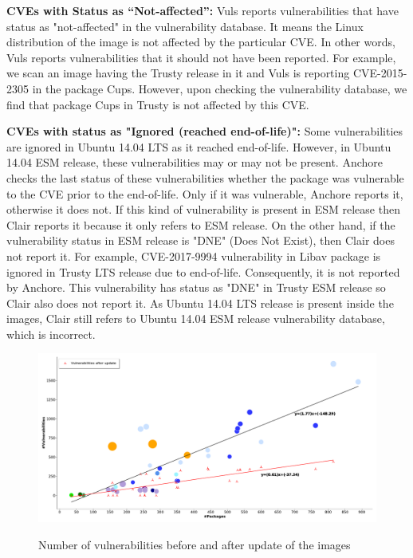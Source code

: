 \documentclass[a4paper,num-refs]{oup-contemporary}
\begin{document}
\textbf{CVEs with Status as “Not-affected”:} Vuls reports vulnerabilities that have status
as "not-affected" in the vulnerability database. It means the Linux distribution of the image is not affected
by the particular CVE. In other words, Vuls reports vulnerabilities that it should not have been reported.
For example, we scan an image having the Trusty release in it and Vuls is reporting CVE-2015-2305
in the package Cups. However, upon checking the vulnerability database, we find that package Cups in Trusty is not
affected by this CVE.

\textbf{CVEs with status as "Ignored (reached end-of-life)":}
Some vulnerabilities are ignored in Ubuntu 14.04 LTS as it reached end-of-life. 
However, in Ubuntu 14.04 ESM release, these vulnerabilities may or may not be present.
Anchore checks the last status of these vulnerabilities whether the package was vulnerable to the CVE
prior to the end-of-life. Only if it was vulnerable, Anchore reports it, otherwise it does not.
If this kind of vulnerability is present in ESM release then Clair reports it because it
only refers to ESM release. On the other hand, if the vulnerability
status in ESM release is "DNE" (Does Not Exist), then Clair does not report it. 
For example, CVE-2017-9994 vulnerability in Libav package is ignored in Trusty LTS release due to end-of-life.
Consequently, it is not reported by Anchore. This vulnerability has status as "DNE" in Trusty ESM
release so Clair also does not report it. As Ubuntu 14.04 LTS release is present inside the images,
Clair still refers to Ubuntu 14.04 ESM release vulnerability database, which is incorrect.

\begin{figure}[!ht]
        {\includegraphics[width=\textwidth]
        {Figures/vulnwithupdate.pdf}}
	\vspace*{-7mm}
        \caption{\label{fig:graph2} Number of vulnerabilities before and
        after update of the images}
      \end{figure}
\end{document}
